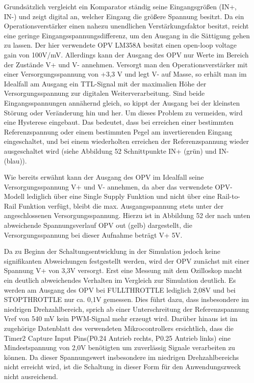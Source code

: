 Grundsätzlich vergleicht ein Komparator ständig seine Eingangsgrößen (IN+, IN-) und zeigt digital an, welcher Eingang die größere Spannung besitzt. Da ein Operationsverstärker einen nahezu unendlichen Verstärkungsfaktor besitzt, reicht eine geringe Eingangsspannungsdifferenz, um den Ausgang in die Sättigung gehen zu lassen. Der hier verwendete OPV LM358A besitzt einen open-loop voltage gain von 100V/mV. Allerdings kann der Ausgang des OPV nur Werte im Bereich der Zustände V+ und V- annehmen. Versorgt man den Operationsverstärker mit einer Versorgungsspannung von +3,3 V und legt V- auf Masse, so erhält man im Idealfall am Ausgang ein TTL-Signal mit der maximalien Höhe der Versorgungsspannung zur digitalen Weiterverarbeitung. Sind beide Eingangsspannungen annähernd gleich, so kippt der Ausgang bei der kleinsten Störung oder Veränderung hin und her. Um dieses Problem zu vermeiden, wird eine Hysterese eingebaut. Das bedeutet, dass bei erreichen einer bestimmten Referenzspannung oder einem bestimmten Pegel am invertierenden Eingang eingeschaltet, und bei einem wiederholten erreichen der Referenzspannung wieder ausgeschaltet wird (siehe Abbildung 52 Schnittpunkte IN+ (grün) und IN- (blau)).\vspace{11pt}

Wie bereits erwähnt kann der Ausgang des OPV im Idealfall seine Versorgungsspannung V+ und V- annehmen, da aber das verwendete OPV-Modell lediglich über eine Single Supply Funktion und nicht über eine Rail-to-Rail Funktion verfügt, bleibt die max. Ausgangsspannung stets unter der angeschlossenen Versorgungsspannung. Hierzu ist in Abbildung 52 der nach unten abweichende Spannungsverlauf OPV out (gelb) dargestellt, die Versorgungsspannung bei dieser Aufnahme beträgt V+ 5V.\vspace{11pt}

Da zu Beginn der Schaltungsentwicklung in der Simulation jedoch keine signifikanten Abweichungen festgestellt werden, wird der OPV zunächst mit einer Spannung V+ von 3,3V versorgt. Erst eine Messung mit dem Ozilloskop macht ein deutlich abweichendes Verhalten im Vergleich zur Simulation deutlich. Es werden am Ausgang des OPV bei FULLTHROTTLE lediglich 2,08V und bei \glqq{}STOPTHROTTLE \grqq{} nur ca. 0,1V gemessen. Dies führt dazu, dass insbesondere im niedrigen Drehzahlbereich, sprich ab einer Unterschreitung der Referenzspannung Vref von 540 mV kein PWM-Signal mehr erzeugt wird. Darüber hinaus ist im zugehörige Datenblatt des verwendeten Mikrocontrollers ersichtlich, dass die Timer2 Capture Input Pins(P0.24 Antrieb rechts, P0.25 Antrieb links) eine Mindestspannung von 2,0V benötigten um zuverlässig Signale verarbeiten zu können. Da dieser Spannungswert insbesondere im niedrigen Drehzahlbereichs nicht erreicht wird, ist die Schaltung in dieser Form für den Anwendungszweck nicht ausreichend.\vspace{11pt}

